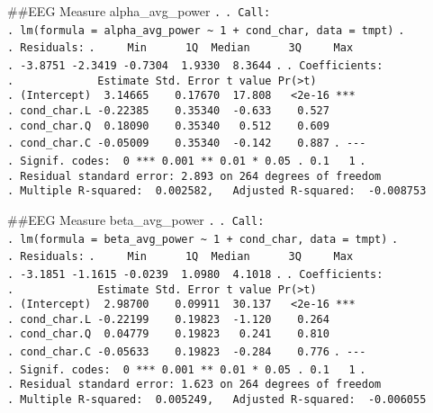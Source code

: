 \documentclass[
]{article}
\begin{document}
\#\#EEG Measure alpha\_avg\_power \texttt{.} \texttt{.\ Call:}
\texttt{.\ lm(formula\ =\ alpha\_avg\_power\ \textasciitilde{}\ 1\ +\ cond\_char,\ data\ =\ tmpt)}
\texttt{.} \texttt{.\ Residuals:}
\texttt{.\ \ \ \ \ Min\ \ \ \ \ \ 1Q\ \ Median\ \ \ \ \ \ 3Q\ \ \ \ \ Max}
\texttt{.\ -3.8751\ -2.3419\ -0.7304\ \ 1.9330\ \ 8.3644} \texttt{.}
\texttt{.\ Coefficients:}
\texttt{.\ \ \ \ \ \ \ \ \ \ \ \ \ Estimate\ Std.\ Error\ t\ value\ Pr(\textgreater{}\textbar{}t\textbar{})}
\texttt{.\ (Intercept)\ \ 3.14665\ \ \ \ 0.17670\ \ 17.808\ \ \ \textless{}2e-16\ ***}
\texttt{.\ cond\_char.L\ -0.22385\ \ \ \ 0.35340\ \ -0.633\ \ \ \ 0.527}
\texttt{.\ cond\_char.Q\ \ 0.18090\ \ \ \ 0.35340\ \ \ 0.512\ \ \ \ 0.609}
\texttt{.\ cond\_char.C\ -0.05009\ \ \ \ 0.35340\ \ -0.142\ \ \ \ 0.887}
\texttt{.\ -\/-\/-}
\texttt{.\ Signif.\ codes:\ \ 0\ \textquotesingle{}***\textquotesingle{}\ 0.001\ \textquotesingle{}**\textquotesingle{}\ 0.01\ \textquotesingle{}*\textquotesingle{}\ 0.05\ \textquotesingle{}.\textquotesingle{}\ 0.1\ \textquotesingle{}\ \textquotesingle{}\ 1}
\texttt{.}
\texttt{.\ Residual\ standard\ error:\ 2.893\ on\ 264\ degrees\ of\ freedom}
\texttt{.\ Multiple\ R-squared:\ \ 0.002582,\ \ \ Adjusted\ R-squared:\ \ -0.008753}

\#\#EEG Measure beta\_avg\_power \texttt{.} \texttt{.\ Call:}
\texttt{.\ lm(formula\ =\ beta\_avg\_power\ \textasciitilde{}\ 1\ +\ cond\_char,\ data\ =\ tmpt)}
\texttt{.} \texttt{.\ Residuals:}
\texttt{.\ \ \ \ \ Min\ \ \ \ \ \ 1Q\ \ Median\ \ \ \ \ \ 3Q\ \ \ \ \ Max}
\texttt{.\ -3.1851\ -1.1615\ -0.0239\ \ 1.0980\ \ 4.1018} \texttt{.}
\texttt{.\ Coefficients:}
\texttt{.\ \ \ \ \ \ \ \ \ \ \ \ \ Estimate\ Std.\ Error\ t\ value\ Pr(\textgreater{}\textbar{}t\textbar{})}
\texttt{.\ (Intercept)\ \ 2.98700\ \ \ \ 0.09911\ \ 30.137\ \ \ \textless{}2e-16\ ***}
\texttt{.\ cond\_char.L\ -0.22199\ \ \ \ 0.19823\ \ -1.120\ \ \ \ 0.264}
\texttt{.\ cond\_char.Q\ \ 0.04779\ \ \ \ 0.19823\ \ \ 0.241\ \ \ \ 0.810}
\texttt{.\ cond\_char.C\ -0.05633\ \ \ \ 0.19823\ \ -0.284\ \ \ \ 0.776}
\texttt{.\ -\/-\/-}
\texttt{.\ Signif.\ codes:\ \ 0\ \textquotesingle{}***\textquotesingle{}\ 0.001\ \textquotesingle{}**\textquotesingle{}\ 0.01\ \textquotesingle{}*\textquotesingle{}\ 0.05\ \textquotesingle{}.\textquotesingle{}\ 0.1\ \textquotesingle{}\ \textquotesingle{}\ 1}
\texttt{.}
\texttt{.\ Residual\ standard\ error:\ 1.623\ on\ 264\ degrees\ of\ freedom}
\texttt{.\ Multiple\ R-squared:\ \ 0.005249,\ \ \ Adjusted\ R-squared:\ \ -0.006055}
\end{document}
